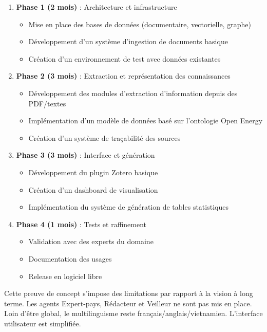 \documentclass[a4paper,11pt]{report}
\providecommand{\tightlist}{\setlength{\itemsep}{0pt}\setlength{\parskip}{0pt}}
\begin{document}
\begin{enumerate}
\def\labelenumi{\arabic{enumi}.}
\item
  \textbf{Phase 1 (2 mois)} : Architecture et infrastructure

  \begin{itemize}
  \tightlist
  \item
    Mise en place des bases de données (documentaire, vectorielle, graphe)
  \item
    Développement d'un système d'ingestion de documents basique
  \item
    Création d'un environnement de test avec données existantes
  \end{itemize}
\item
  \textbf{Phase 2 (3 mois)} : Extraction et représentation des connaissances

  \begin{itemize}
  \tightlist
  \item
    Développement des modules d'extraction d'information depuis des PDF/textes
  \item
    Implémentation d'un modèle de données basé sur l'ontologie Open Energy
  \item
    Création d'un système de traçabilité des sources
  \end{itemize}
\item
  \textbf{Phase 3 (3 mois)} : Interface et génération

  \begin{itemize}
  \tightlist
  \item
    Développement du plugin Zotero basique
  \item
    Création d'un dashboard de visualisation
  \item
    Implémentation du système de génération de tables statistiques
  \end{itemize}
\item
  \textbf{Phase 4 (1 mois)} : Tests et raffinement

  \begin{itemize}
  \tightlist
  \item
    Validation avec des experts du domaine
  \item
    Documentation des usages
  \item
    Release en logiciel libre
  \end{itemize}
\end{enumerate}

Cette preuve de concept s'impose des limitations par rapport à la vision à long terme. Les agents Expert-pays, Rédacteur et Veilleur ne sont pas mis en place. Loin d'être global, le multilinguisme reste français/anglais/vietnamien. L'interface utilisateur est simplifiée.
\end{document}
